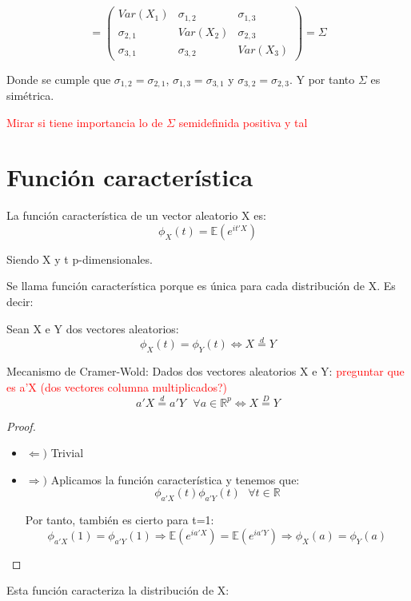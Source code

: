 \documentclass[palatino,nochap]{apuntes}
\begin{document}
\begin{itemize}
\[
=\left(
\begin{array}{ccc}
Var(X_1)& \sigma_{1,2}& \sigma_{1,3} \\
\sigma_{2,1}& Var(X_2)& \sigma_{2,3} \\
\sigma_{3,1}& \sigma_{3,2}& Var(X_3)
\end{array}
\right) = \Sigma
\]

Donde se cumple que $\sigma_{1,2}=\sigma_{2,1}$, $\sigma_{1,3}=\sigma_{3,1}$ y $\sigma_{3,2}=\sigma_{2,3}$. Y por tanto $\Sigma$ es simétrica.
\end{itemize}




\textcolor{red}{Mirar si tiene importancia lo de $\Sigma$ semidefinida positiva y tal}

\section{Función característica}
La función característica de un vector aleatorio X es:
\[
\phi_X(t)=\mathbb{E}(e^{it'X})
\]

Siendo X y t p-dimensionales.

Se llama función característica porque es única para cada distribución de X. Es decir:
\begin{prop} Sean X e Y dos vectores aleatorios:
\[
\phi_X(t)=\phi_Y(t) \Leftrightarrow X \stackrel{d}{=} Y
\]
\end{prop}

\begin{prop} Mecanismo de Cramer-Wold: Dados dos vectores aleatorios X e Y:
\textcolor{red}{preguntar que es a'X (dos vectores columna multiplicados?)}
\[
a'X \stackrel{d}{=} a'Y \text{ } \forall a \in \mathbb{R}^p \Leftrightarrow X \stackrel{D}{=} Y
\] 
\begin{proof}
\begin{itemize}
\item $\Leftarrow)$ Trivial
\item $\Rightarrow)$ Aplicamos la función característica y tenemos que:
$$\phi_{a'X}(t) \phi_{a'Y}(t) \text{ } \forall t \in \mathbb{R}$$

Por tanto, también es cierto para t=1:
$$\phi_{a'X}(1) = \phi_{a'Y}(1) \Rightarrow \mathbb{E}(e^{ia'X})=\mathbb{E}(e^{ia'Y}) \Rightarrow \phi_{X}(a)=\phi_{Y}(a)$$
\end{itemize}
\end{proof}
\end{prop}

Esta función caracteriza la distribución de X:
\end{document}
